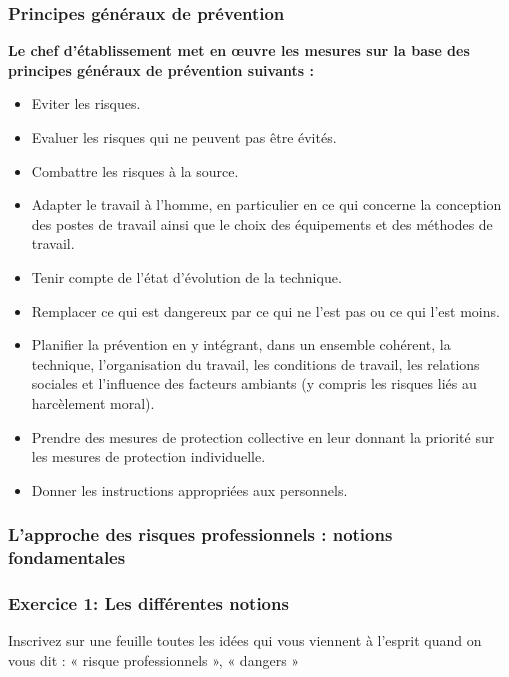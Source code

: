 \documentclass{beamer}
\begin{document}
\begin{frame}
\frametitle{Principes généraux de prévention}

\textbf{Le chef d'établissement met en œuvre les mesures sur la base des principes généraux de prévention suivants :}
\begin{itemize}
\item Eviter les risques.

\item Evaluer les risques qui ne peuvent pas être évités.

\item Combattre les risques à la source.

\item Adapter le travail à l’homme, en particulier en ce qui concerne la conception des postes de travail ainsi que  le choix des équipements et des méthodes de travail.

\item Tenir compte de l’état d’évolution de la technique.

\item Remplacer ce qui est dangereux par ce qui ne l’est pas ou ce qui l’est moins.

\item Planifier la prévention en y intégrant, dans un ensemble cohérent, la technique, l’organisation du travail, les conditions de travail, les relations sociales et l’influence des facteurs ambiants (y compris les risques liés au harcèlement moral).

\item Prendre des mesures de protection collective en leur donnant la priorité sur les mesures de protection individuelle.

\item Donner les instructions appropriées aux personnels.
\end{itemize}

\end{frame}

\begin{frame}
\frametitle{L’approche des risques professionnels : notions fondamentales}

\end{frame} 


\begin{frame}
\frametitle{Exercice 1: Les différentes notions}

Inscrivez sur une feuille toutes les idées qui vous viennent à l’esprit quand on vous dit : 
« risque professionnels », « dangers »

\end{frame} 
\end{document}
